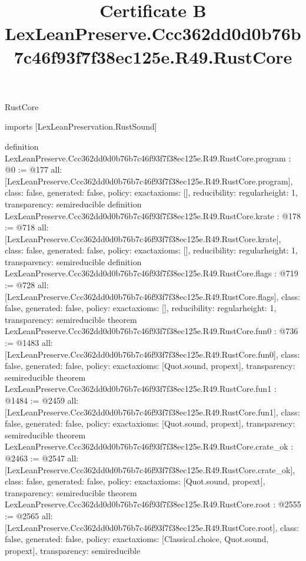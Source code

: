 \begin{lexlean}{RustCore}
\title{Certificate B LexLeanPreserve.Ccc362dd0d0b76b7c46f93f7f38ec125e.R49.RustCore}
\begin{coremodule}
imports [LexLeanPreservation.RustSound]

definition LexLeanPreserve.Ccc362dd0d0b76b7c46f93f7f38ec125e.R49.RustCore.program : @0 := @177 {
  all: [LexLeanPreserve.Ccc362dd0d0b76b7c46f93f7f38ec125e.R49.RustCore.program],
  class: false,
  generated: false,
  policy: exact{axioms: []},
  reducibility: regular{height: 1},
  transparency: semireducible
}
definition LexLeanPreserve.Ccc362dd0d0b76b7c46f93f7f38ec125e.R49.RustCore.krate : @178 := @718 {
  all: [LexLeanPreserve.Ccc362dd0d0b76b7c46f93f7f38ec125e.R49.RustCore.krate],
  class: false,
  generated: false,
  policy: exact{axioms: []},
  reducibility: regular{height: 1},
  transparency: semireducible
}
definition LexLeanPreserve.Ccc362dd0d0b76b7c46f93f7f38ec125e.R49.RustCore.flags : @719 := @728 {
  all: [LexLeanPreserve.Ccc362dd0d0b76b7c46f93f7f38ec125e.R49.RustCore.flags],
  class: false,
  generated: false,
  policy: exact{axioms: []},
  reducibility: regular{height: 1},
  transparency: semireducible
}
theorem LexLeanPreserve.Ccc362dd0d0b76b7c46f93f7f38ec125e.R49.RustCore.fun0 : @736 := @1483 {
  all: [LexLeanPreserve.Ccc362dd0d0b76b7c46f93f7f38ec125e.R49.RustCore.fun0],
  class: false,
  generated: false,
  policy: exact{axioms: [Quot.sound, propext]},
  transparency: semireducible
}
theorem LexLeanPreserve.Ccc362dd0d0b76b7c46f93f7f38ec125e.R49.RustCore.fun1 : @1484 := @2459 {
  all: [LexLeanPreserve.Ccc362dd0d0b76b7c46f93f7f38ec125e.R49.RustCore.fun1],
  class: false,
  generated: false,
  policy: exact{axioms: [Quot.sound, propext]},
  transparency: semireducible
}
theorem LexLeanPreserve.Ccc362dd0d0b76b7c46f93f7f38ec125e.R49.RustCore.crate_ok : @2463 := @2547 {
  all: [LexLeanPreserve.Ccc362dd0d0b76b7c46f93f7f38ec125e.R49.RustCore.crate_ok],
  class: false,
  generated: false,
  policy: exact{axioms: [Quot.sound, propext]},
  transparency: semireducible
}
theorem LexLeanPreserve.Ccc362dd0d0b76b7c46f93f7f38ec125e.R49.RustCore.root : @2555 := @2565 {
  all: [LexLeanPreserve.Ccc362dd0d0b76b7c46f93f7f38ec125e.R49.RustCore.root],
  class: false,
  generated: false,
  policy: exact{axioms: [Classical.choice, Quot.sound, propext]},
  transparency: semireducible
}


\end{coremodule}
\end{lexlean}
